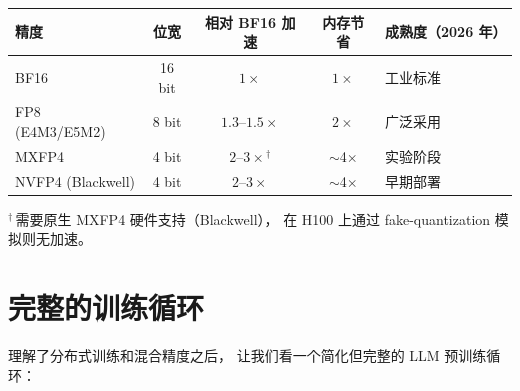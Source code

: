 \begin{center}
\begin{tabular}{lcccl}
  \hline
  \textbf{精度} & \textbf{位宽} & \textbf{相对 BF16 加速}
  & \textbf{内存节省} & \textbf{成熟度（2026 年）} \\
  \hline
  BF16 & 16 bit & $1\times$ & $1\times$ & 工业标准 \\
  FP8 (E4M3/E5M2) & 8 bit & $1.3$--$1.5\times$ & $2\times$ & 广泛采用 \\
  MXFP4 & 4 bit & $2$--$3\times$$^\dagger$ & $\sim$4$\times$ & 实验阶段 \\
  NVFP4 (Blackwell) & 4 bit & $2$--$3\times$ & $\sim$4$\times$ & 早期部署 \\
  \hline
\end{tabular}

\small $^\dagger$\,需要原生 MXFP4 硬件支持（Blackwell），
在 H100 上通过 fake-quantization 模拟则无加速。
\end{center}

\section{完整的训练循环}

理解了分布式训练和混合精度之后，
让我们看一个简化但完整的 LLM 预训练循环：

